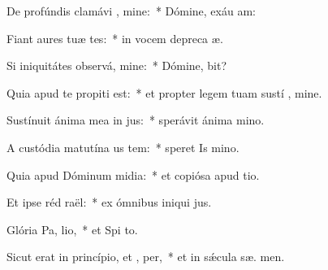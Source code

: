 \item De profúndis clamávi  , mine:~* Dómine, exáu  am:
\item Fiant aures tuæ tes:~* in vocem depreca æ.
\item Si iniquitátes observá, mine:~* Dómine,  bit?
\item Quia apud te propiti est:~* et propter legem tuam sustí , mine.
\item Sustínuit ánima mea in  jus:~* sperávit ánima   mino.
\item A custódia matutína us  tem:~* speret Is  mino.
\item Quia apud Dóminum midia:~* et copiósa apud  tio.
\item Et ipse réd raël:~* ex ómnibus iniqui jus.
\item Glória Pa,  lio,~* et Spi to.
\item Sicut erat in princípio, et ,  per,~* et in sǽcula sæ. men.
